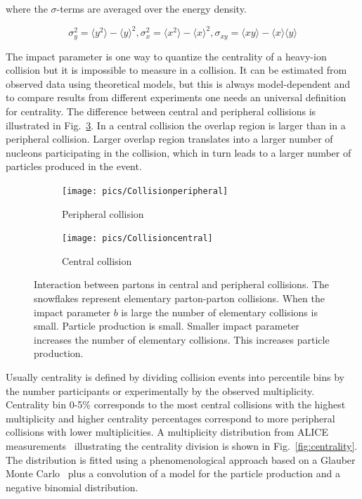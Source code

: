\noindent where the $\sigma$-terms are averaged over the energy density.

\begin{equation}
\sigma_y^2=\langle y^2\rangle-\langle y \rangle ^2, \sigma_x^2=\langle x^2\rangle-\langle x \rangle ^2, \sigma_{xy}=\langle xy \rangle - \langle x \rangle \langle y \rangle
\end{equation}

The impact parameter is one way to quantize the centrality of a heavy-ion collision but it is impossible to measure in a collision. It can be estimated from observed data using theoretical models, but this is always model-dependent and to compare results from different experiments one needs an universal definition for centrality. The difference between central and peripheral collisions is illustrated in Fig.~\ref{fig:collisionA}. In a central collision the overlap region is larger than in a peripheral collision. Larger overlap region translates into a larger number of nucleons participating in the collision, which in turn leads to a larger number of particles produced in the event.


\begin{figure}[h!]
\centering
        \begin{subfigure}[b]{0.45\textwidth}
                \centering
            	\texttt{[image: pics/Collisionperipheral]}
                \caption{Peripheral collision}
                \label{fig:peripheral}
        \end{subfigure}
        \begin{subfigure}[b]{0.45\textwidth}
                \centering
               \texttt{[image: pics/Collisioncentral]}
                \caption{Central collision}
                \label{fig:central}
        \end{subfigure}
        \caption[Interaction between partons in central and peripheral collisions.]{Interaction between partons in central and peripheral collisions. The snowflakes represent elementary parton-parton collisions. When the impact parameter $b$ is large the number of elementary collisions is small. Particle production is small. Smaller impact parameter increases the number of elementary collisions. This increases  particle production.}\label{fig:collisionA}
\end{figure}

Usually centrality is defined by dividing collision events into percentile bins by the number participants or experimentally by the observed multiplicity. Centrality bin 0-5\% corresponds to the most central collisions with the highest multiplicity and higher centrality percentages correspond to more peripheral collisions with lower multiplicities. A multiplicity distribution from ALICE measurements~\cite{PhysRevC.88.044909} illustrating the centrality division is shown in Fig.~\ref{fig:centrality}. The distribution is fitted using a phenomenological approach based on a Glauber Monte Carlo~\cite{Miller:2007ri} plus a convolution of a model for the particle production and a negative binomial distribution. 


